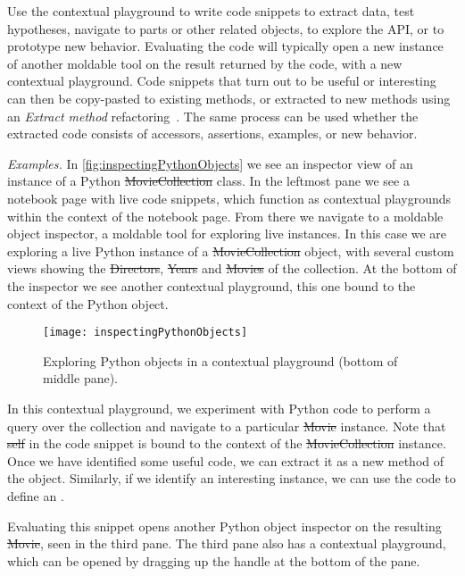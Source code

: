 \documentclass[acmsmall,screen,authorversion,nonacm]{acmart} %
\newcommand\cp[1]{\nbe{Cesare}{#1}{olive}} %
\newcommand{\patref}[1]{\emph{\nameref{pat:#1}}\xspace}
\newcommand{\patsec}[1]{\noindent\textit{#1.}\xspace}
\begin{document}
Use the contextual playground to write code snippets to extract data, test hypotheses, navigate to parts or other related objects, to explore the API, or to prototype new behavior.
Evaluating the code will typically open a new instance of another moldable tool on the result returned by the code, with a new contextual playground.
Code snippets that turn out to be useful or interesting can then be copy-pasted to existing methods, or extracted to new methods using an \emph{Extract method} refactoring~\cite{Fowl99a}.
The same process can be used whether the extracted code consists of accessors, assertions, examples, or new behavior.

\patsec{Examples}
In \autoref{fig:inspectingPythonObjects} we see an inspector view 
of an instance of a Python \st{MovieCollection} class.
In the leftmost pane we see a notebook page with live code snippets, which function as contextual playgrounds within the context of the notebook page.
From there we navigate to a moldable object inspector, a moldable tool for exploring live instances.
In this case we are exploring a live Python instance of a \st{MovieCollection} object, with several custom views showing the \st{Directors}, \st{Years} and \st{Movies} of the collection.
At the bottom of the inspector we see another contextual playground, this one bound to the context of the Python object.

\begin{figure}[h]
  \texttt{[image: inspectingPythonObjects]}
  \caption{Exploring Python objects in a contextual playground (bottom of middle pane).}
  \label{fig:inspectingPythonObjects}
\end{figure}

In this contextual playground, we experiment with Python code to perform a query over the collection and navigate to a particular \st{Movie} instance.
Note that \st{self} in the code snippet is bound to the context of the \st{MovieCollection} instance.
Once we have identified some useful code, we can extract it as a new method of the object.
Similarly, if we identify an interesting instance, we can use the code to define an \patref{ExampleObject}.

Evaluating this snippet opens another Python object inspector on the resulting \st{Movie}, seen in the third pane.
The third pane also has a contextual playground, which can be opened by dragging up the handle at the bottom of the pane.
\end{document}
